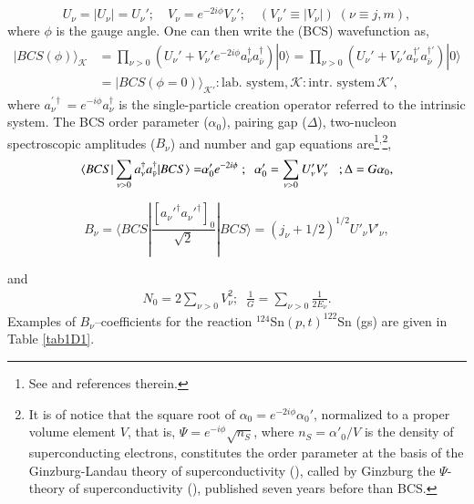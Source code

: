 \begin{equation}
U_\nu=|U_\nu|=U_\nu';\quad V_\nu=e^{-2i\phi}V_\nu';\quad(V_\nu'\equiv|V_\nu|)\;(\nu\equiv j,m),
\end{equation}
where $\phi$ is the gauge angle. One can then write the  (BCS) wavefunction as, 
\begin{equation}
\begin{split}
|BCS(\phi)\rangle_{\mathcal K}&=\prod_{\nu>0} \left(U_\nu'+V_\nu'e^{-2i\phi}a_\nu^\dagger a_{\bar{\nu}}^\dagger\right)|0\rangle=\prod_{\nu>0}\left(U_\nu'+V_\nu'a_\nu^{\dagger'} a_{\bar{\nu}}^{\dagger'}\right)|0\rangle\\
&=|BCS(\phi=0)\rangle_{\mathcal{K'}}:\text{lab. system},\mathcal{K}:\text{intr. system}\,\mathcal{K}',
\end{split}
\end{equation}
where $a_{\nu}^{'\dagger}=e^{-i\phi}a_{\nu}^{\dagger}$ is the single-particle creation operator referred to the intrinsic system.
The BCS  order parameter ($\alpha_0$), pairing gap ($\Delta$), two-nucleon spectroscopic amplitudes ($B_\nu$) and number and gap equations are\footnote{See \cite{Potel:17} and references therein.}$^{,}$\footnote{It is of notice that the square root of $\alpha_0=e^{-2i\phi}\alpha_0'$, normalized to a proper volume element $V$, that is, $\Psi=e^{-i\phi}\sqrt{n_S}$, where $n_S=\alpha'_0/V$ is the density of superconducting electrons, constitutes the order parameter at the basis of the Ginzburg-Landau theory of superconductivity (\cite{Ginzburg:50}), called by Ginzburg the $\Psi$-theory of superconductivity (\cite{Ginzburg:04}), published seven years before than BCS.},
\begin{equation}
\begin{split}
\langle {BCS|\sum_{\nu>0}a^\dagger_\nu a^\dagger_{\bar\nu}|BCS} \rangle=&\alpha_0'e^{-2i\phi}\; ; \;\;\alpha_0'=\sum_{\nu>0}U_\nu'V_\nu' \;\;\;;\Delta=G\alpha_0,\\
\end{split}
\end{equation}


\begin{equation}
B_\nu=\langle BCS|\frac{[a_\nu'^\dagger a_\nu'^\dagger]_0}{\sqrt{2}}|BCS\rangle=(j_\nu+1/2)^{1/2}U'_\nu V'_\nu,
\end{equation}

and
\begin{equation}
\begin{split} N_0=2\sum_{\nu>0}V^2_\nu;\;\;\frac{1}{G}=\sum_{\nu>0}\frac{1}{2E_\nu}.
\end{split}
\end{equation}
Examples of $B_\nu$--coefficients for the reaction $^{124}$Sn$(p,t)^{122}$Sn (gs) are given in Table \ref{tab1D1}. 


